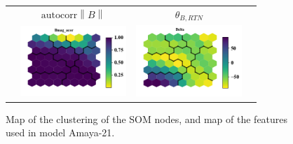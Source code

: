 \documentclass[utf8]{frontiersSCNS} %
\begin{document}
\begin{figure}[h!]
\begin{tabular}{CCCC}
		\\
		& $\text{autocorr} \left\lVert B \right\rVert$ & $\theta_{B,RTN}$ & \\
		& \includegraphics[width=4cm]{Amaya/comp-map-Bmag_acor} &
		\includegraphics[width=4cm]{Amaya/comp-map-Delta} & \hfill
		\\
	\end{tabular}
	\caption{Map of the clustering of the SOM nodes, and map of the features used in model Amaya-21.}\label{fig:compmap}
\end{figure}
\end{document}
